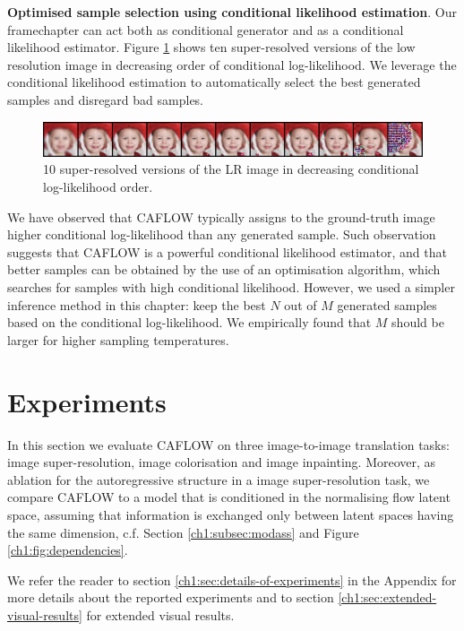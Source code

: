 \smallskip

\textbf{Optimised sample selection using conditional likelihood estimation}. \color{black}Our framechapter can act both as conditional generator and as a conditional likelihood estimator. Figure \ref{ch1:fig:decreasingloglikelihood} shows ten super-resolved versions of the low resolution image in decreasing order of conditional log-likelihood. We leverage the conditional likelihood estimation to automatically select the best generated samples and disregard bad samples. 

\begin{figure}[h!]
    \centering
    \includegraphics[width=\textwidth]{Chapter1/paper_graphs/10samples_decreasing_conditional_loglikelihood.png}
    \caption{10 super-resolved versions of the LR image in decreasing conditional log-likelihood order.}
    \label{ch1:fig:decreasingloglikelihood}
\end{figure}

We have observed that CAFLOW typically assigns to the ground-truth image higher conditional log-likelihood than any generated sample. Such observation suggests that CAFLOW is a powerful conditional likelihood estimator, and that better samples can be obtained by the use of an optimisation algorithm, which searches for samples with high conditional likelihood. However, we used a simpler inference method in this chapter: keep the best $N$ out of $M$ generated samples based on the conditional log-likelihood. We empirically found that $M$ should be larger for higher sampling temperatures.

\section{Experiments}\label{ch1:sec:numerics}
In this section we evaluate CAFLOW on three image-to-image translation tasks: image super-resolution, image colorisation and image inpainting. Moreover, as ablation for the autoregressive structure in a image super-resolution task, we compare CAFLOW to a model that is conditioned in the normalising flow latent space, assuming that information is exchanged only between latent spaces having the same dimension, c.f. Section \ref{ch1:subsec:modass} and Figure \ref{ch1:fig:dependencies}. 

We refer the reader to section \ref{ch1:sec:details-of-experiments} in the Appendix for more details about the reported experiments and to section \ref{ch1:sec:extended-visual-results} for extended visual results.

